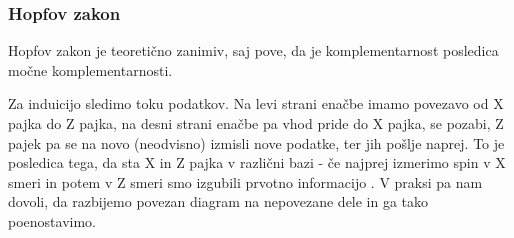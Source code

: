 \documentclass[mat1]{fmfdelo}
\begin{document}
\subsubsection{Hopfov zakon} \label{hopf}
Hopfov zakon je teoretično zanimiv, saj pove, da je komplementarnost posledica močne komplementarnosti.
\begin{center}
\end{center}
Za induicijo sledimo toku podatkov. Na levi strani enačbe imamo povezavo od X pajka do Z pajka, na desni strani enačbe pa vhod pride do X pajka, se pozabi, Z pajek pa se na novo (neodvisno) izmisli nove podatke, ter jih pošlje naprej. To je posledica tega, da sta X in Z pajka v različni bazi - če najprej izmerimo spin v X smeri in potem v Z smeri smo izgubili prvotno informacijo \cite[definicija 8.27]{coecke_kissinger_2017}. V praksi pa nam dovoli, da razbijemo povezan diagram na nepovezane dele in ga tako poenostavimo.
\end{document}
